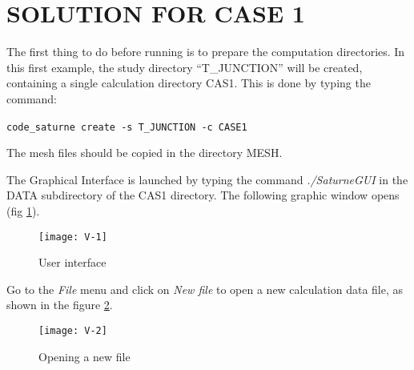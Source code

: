 
%
%
%
%


\section{SOLUTION FOR CASE 1}
The first thing to do before running \CS is to prepare the computation
directories. In this first example, the study directory ``T\_JUNCTION'' will be
created, containing a single calculation directory CAS1. This is done by typing
the command:
\begin{center}
\texttt{code\_saturne create -s T\_JUNCTION -c CASE1}\
\end{center}
The mesh files should be copied in the directory MESH.

The \CS Graphical Interface is launched by typing the command
{\itshape ./SaturneGUI} in the DATA subdirectory of the CAS1 directory.
The following graphic window opens (fig \ref{fig1_e1}).

\begin{figure}[ht]
\begin{center}
\texttt{[image: V-1]}
\caption{User interface}
\label{fig1_e1}
\end{center}
\end{figure}


\clearpage
Go to the {\itshape File} menu and click on {\itshape New file} to open a new
calculation data file, as shown in the figure
\ref{fig2_e1}.

\begin{figure}[ht]
\begin{center}
\texttt{[image: V-2]}
\caption{Opening a new file}
\label{fig2_e1}
\end{center}
\end{figure}


